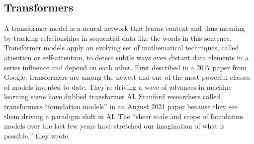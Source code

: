
        \subsection{Transformers}
        A transformer model is a neural network that learns context and thus meaning by tracking relationships in sequential data like the words in this sentence.
        Transformer models apply an evolving set of mathematical techniques, called attention or self-attention, to detect subtle ways even distant data elements in a series influence and depend on each other.
        First described in a 2017 paper from Google\cite{vaswani2023attention}, transformers are among the newest and one of the most powerful classes of models invented to date. They’re driving a wave of advances in machine learning some have dubbed transformer AI.
        Stanford researchers called transformers “foundation models” in an August 2021 paper\cite{bommasani2021opportunities} because they see them driving a paradigm shift in AI. The “sheer scale and scope of foundation models over the last few years have stretched our imagination of what is possible,” they wrote.


